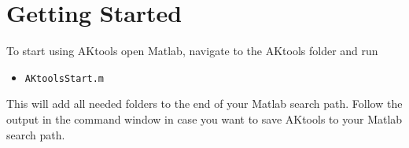 \documentclass[11pt]{scrartcl}
\begin{document}


\section*{{\color{tu_red}Getting Started}}
\label{sec:genralInfo}
\setcounter{page}{1}

To start using AKtools open Matlab, navigate to the AKtools folder and run
\begin{itemize}
	\item[] \texttt{AKtoolsStart.m}
\end{itemize}
This will add all needed folders to the end of your Matlab search path. Follow the output in the command window in case you want to save AKtools to your Matlab search path.\\
\end{document}
